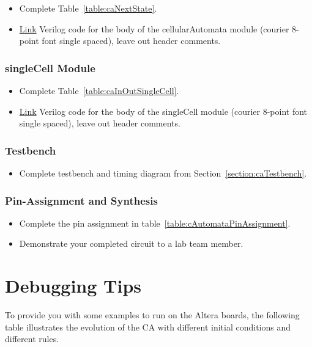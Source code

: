 \begin{itemize}
\item
  Complete Table~\ref{table:caNextState}.
\item
  \protect\hyperlink{cellularAutomata_verilog}{Link} Verilog code for
  the body of the cellularAutomata module (courier 8-point font single
  spaced), leave out header comments.
\end{itemize}

\subsubsection{singleCell Module}

\begin{itemize}
\item
  Complete Table~\ref{table:caInOutSingleCell}.
\item
  \protect\hyperlink{singleCell_verilog}{Link} Verilog code for the body
  of the singleCell module (courier 8-point font single spaced), leave
  out header comments.
\end{itemize}

\subsubsection{Testbench}
\begin{itemize}
\item Complete testbench and timing diagram from Section~\ref{section:caTestbench}.
\end{itemize}

\subsubsection{Pin-Assignment and Synthesis}
\begin{itemize}
\item Complete the pin assignment in table~\ref{table:cAutomataPinAssignment}.
\item Demonstrate your completed circuit to a lab team member.
\end{itemize}




\section{Debugging Tips}
\label{section:caDebugging}
To provide you with some examples to run on the Altera boards, the
following table illustrates the evolution of the CA with different
initial conditions and different rules.

